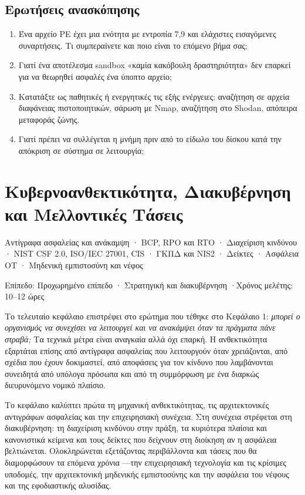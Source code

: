 \documentclass[11pt,openany]{book}
\newcommand{\chaptermeta}[3]{%
  {\sffamily\small\color{accent}#1\par}\vspace{0.3em}
  {\sffamily\footnotesize\color{gray}#2 \quad·\quad #3\par}\vspace{1.2em}}
\begin{document}
\section*{Ερωτήσεις ανασκόπησης}
\begin{enumerate}
  \item Ένα αρχείο PE έχει μια ενότητα με εντροπία 7,9 και ελάχιστες εισαγόμενες συναρτήσεις. Τι συμπεραίνετε και ποιο είναι το επόμενο βήμα σας;
  \item Γιατί ένα αποτέλεσμα sandbox «καμία κακόβουλη δραστηριότητα» δεν επαρκεί για να θεωρηθεί ασφαλές ένα ύποπτο αρχείο;
  \item Κατατάξτε ως παθητικές ή ενεργητικές τις εξής ενέργειες: αναζήτηση σε αρχεία διαφάνειας πιστοποιητικών, σάρωση με Nmap, αναζήτηση στο Shodan, απόπειρα μεταφοράς ζώνης.
  \item Γιατί πρέπει να συλλέγεται η μνήμη πριν από το είδωλο του δίσκου κατά την απόκριση σε σύστημα σε λειτουργία;
\end{enumerate}

\chapter{Κυβερνοανθεκτικότητα, Διακυβέρνηση και Μελλοντικές Τάσεις}\label{ch:13}
\chaptermeta{Αντίγραφα ασφαλείας και ανάκαμψη · BCP, RPO και RTO · Διαχείριση κινδύνου · NIST CSF 2.0, ISO/IEC 27001, CIS · ΓΚΠΔ και NIS2 · Δείκτες · Ασφάλεια OT · Μηδενική εμπιστοσύνη και νέφος}{Επίπεδο: Προχωρημένο επίπεδο · Στρατηγική και διακυβέρνηση}{Χρόνος μελέτης: 10–12 ώρες}

Το τελευταίο κεφάλαιο επιστρέφει στο ερώτημα που τέθηκε στο Κεφάλαιο 1: \emph{μπορεί ο οργανισμός να συνεχίσει να λειτουργεί και να ανακάμψει όταν τα πράγματα πάνε στραβά;} Τα τεχνικά μέτρα είναι αναγκαία αλλά όχι επαρκή. Η ανθεκτικότητα εξαρτάται επίσης από αντίγραφα ασφαλείας που λειτουργούν όταν χρειάζονται, από σχέδια που έχουν δοκιμαστεί, από αποφάσεις για τον κίνδυνο που λαμβάνονται συνειδητά από υπόλογα πρόσωπα και από τη συμμόρφωση με ένα διαρκώς διευρυνόμενο νομικό πλαίσιο.

Το κεφάλαιο καλύπτει πρώτα τη μηχανική ανθεκτικότητας, τις αρχιτεκτονικές αντιγράφων ασφαλείας και την επιχειρησιακή συνέχεια. Στη συνέχεια στρέφεται στη διακυβέρνηση: τη διαχείριση κινδύνου στην πράξη, τα κυριότερα πλαίσια και κανονιστικά κείμενα και τους δείκτες που δείχνουν στη διοίκηση αν η ασφάλεια βελτιώνεται. Ολοκληρώνεται εξετάζοντας περιβάλλοντα και τάσεις που θα διαμορφώσουν τα επόμενα χρόνια —την επιχειρησιακή τεχνολογία και τις κρίσιμες υποδομές, την αρχιτεκτονική μηδενικής εμπιστοσύνης και την ασφάλεια του νέφους και της εφοδιαστικής αλυσίδας.
\end{document}
